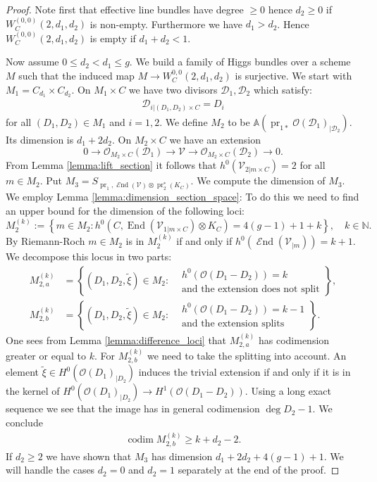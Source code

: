 \documentclass[12pt]{extarticle}
\theoremstyle{definition}
\numberwithin{theorem}{section}
\newcommand{\NN}{\mathbb{N}}
\newcommand{\Aff}{\mathbb{A}}
\newcommand{\OO}{\mathcal{O}}
\newcommand{\cV}{\mathcal{V}}
\newcommand{\cD}{\mathcal{D}}
\newcommand{\op}{\operatorname}
\DeclareMathOperator{\End}{\mathcal{E}nd}
\renewcommand{\tilde}{\widetilde}		%
\begin{document}
\begin{proof}
Note first that effective line bundles have degree $\geq 0$ hence $d_2 \geq 0$ if $W^{(0,0)}_C(2,d_1,d_2)$ is non-empty. Furthermore we have $d_1 > d_2$. Hence $W^{(0,0)}_C(2,d_1,d_2)$ is empty if $d_1 + d_2 < 1$.

Now assume $0 \leq d_2< d_1 \leq g$.
We build a family of Higgs bundles over a scheme $M$ such that the induced map $M \to W_C^{0,0}(2,d_1,d_2)$ is surjective. We start with $M_1 = C_{d_1}\times C_{d_2}$. On $M_1 \times C$ we have two divisors $\cD_1,\cD_2$ which satisfy:
\begin{align*}
 \cD_{i|(D_1,D_2)\times C} = D_i
\end{align*}
for all $(D_1,D_2) \in M_1$ and $i =1,2$. We define $M_2$ to be $\Aff(\op{pr}_{1*}\OO(\cD_1)_{|\cD_2})$. Its dimension is $d_1 + 2d_2$. On $M_2 \times C$ we have an extension 
\begin{equation}\label{eq:univ_extension_ii}
0 \to \OO_{M_2\times C}(\cD_1) \to \cV \to \OO_{M_2\times C}(\cD_2) \to 0.
\end{equation}
 From Lemma \ref{lemma:lift_section} it follows that $h^0(\cV_{2|m\times C}) = 2$ for all $m \in M_2$. Put $M_3 = S_{\op{pr}_1,\End(\cV)\otimes \op{pr}_2^*(K_C)}$. We compute the dimension of $M_3$. We employ Lemma \ref{lemma:dimension_section_space}: To do this we need to find an upper bound for the dimension of the following loci:
\begin{equation*}
M_2^{(k)} := \left\{ m \in M_2 :  h^0(C,\op{End}\left(\cV_{1|m\times C}\right)\otimes K_C) = 4(g-1)+1+k\right\},\quad k\in \NN. 
\end{equation*}
By Riemann-Roch $m\in M_2$ is in $M_2^{(k)}$ if and only if $h^0(\End(\cV_{|m}))= k+1$. We decompose this locus in two parts:
\begin{align*}
M_{2,a}^{(k)} &= \left\{(D_1,D_2,\tilde{\xi}) \in M_2 : \begin{aligned}
&h^0(\OO(D_1-D_2)) = k \\
&\text{and the extension does not split}
\end{aligned} \right\},\\
M_{2,b}^{(k)} &= \left\{(D_1,D_2,\tilde{\xi}) \in M_2 : \begin{aligned}
&h^0(\OO(D_1-D_2)) = k-1 \\
&\text{and the extension splits}
\end{aligned} \right\}.
\end{align*}
One sees from Lemma \ref{lemma:difference_loci} that $M^{(k)}_{2,a}$ has codimension greater or equal to $k$. For $M^{(k)}_{2,b}$ we need to take the splitting into account. An element $\tilde{\xi}\in H^0(\OO(D_1)_{|D_2})$ induces the trivial extension if and only if it is in the kernel of $H^0(\OO(D_1)_{|D_2})\to H^1(\OO(D_1-D_2))$. Using a long exact sequence we see that the image has in general codimension $\deg D_2 -1$. 
We conclude 
\begin{align*}
\op{codim} M_{2,b}^{(k)} \geq k+d_2 - 2.
\end{align*}
If $d_2 \geq 2$ we have shown that $M_3$ has dimension $d_1 +2d_2 + 4(g-1)+1$. We will handle the cases $d_2 = 0$ and $d_2 = 1$ separately at the end of the proof. 


\end{proof}
\end{document}
